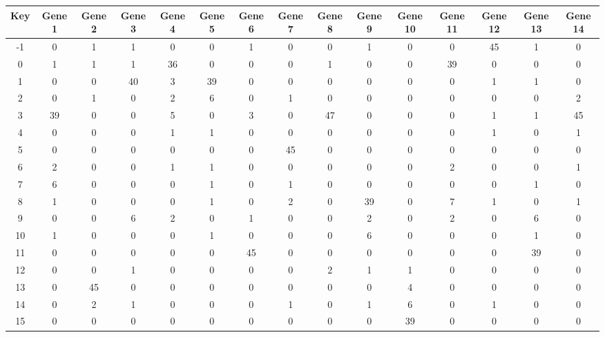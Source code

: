 \begin{tabular}{|c|c|c|c|c|c|c|c|c|c|c|c|c|c|c|}
\hline
Key & Gene 1 & Gene 2 & Gene 3 & Gene 4 & Gene 5 & Gene 6 & Gene 7 & Gene 8 & Gene 9 & Gene 10 & Gene 11 & Gene 12 & Gene 13 & Gene 14 \\
\hline
-1 & 0 & 1 & 1 & 0 & 0 & 1 & 0 & 0 & 1 & 0 & 0 & 45 & 1 & 0 \\
0 & 1 & 1 & 1 & 36 & 0 & 0 & 0 & 1 & 0 & 0 & 39 & 0 & 0 & 0 \\
1 & 0 & 0 & 40 & 3 & 39 & 0 & 0 & 0 & 0 & 0 & 0 & 1 & 1 & 0 \\
2 & 0 & 1 & 0 & 2 & 6 & 0 & 1 & 0 & 0 & 0 & 0 & 0 & 0 & 2 \\
3 & 39 & 0 & 0 & 5 & 0 & 3 & 0 & 47 & 0 & 0 & 0 & 1 & 1 & 45 \\
4 & 0 & 0 & 0 & 1 & 1 & 0 & 0 & 0 & 0 & 0 & 0 & 1 & 0 & 1 \\
5 & 0 & 0 & 0 & 0 & 0 & 0 & 45 & 0 & 0 & 0 & 0 & 0 & 0 & 0 \\
6 & 2 & 0 & 0 & 1 & 1 & 0 & 0 & 0 & 0 & 0 & 2 & 0 & 0 & 1 \\
7 & 6 & 0 & 0 & 0 & 1 & 0 & 1 & 0 & 0 & 0 & 0 & 0 & 1 & 0 \\
8 & 1 & 0 & 0 & 0 & 1 & 0 & 2 & 0 & 39 & 0 & 7 & 1 & 0 & 1 \\
9 & 0 & 0 & 6 & 2 & 0 & 1 & 0 & 0 & 2 & 0 & 2 & 0 & 6 & 0 \\
10 & 1 & 0 & 0 & 0 & 1 & 0 & 0 & 0 & 6 & 0 & 0 & 0 & 1 & 0 \\
11 & 0 & 0 & 0 & 0 & 0 & 45 & 0 & 0 & 0 & 0 & 0 & 0 & 39 & 0 \\
12 & 0 & 0 & 1 & 0 & 0 & 0 & 0 & 2 & 1 & 1 & 0 & 0 & 0 & 0 \\
13 & 0 & 45 & 0 & 0 & 0 & 0 & 0 & 0 & 0 & 4 & 0 & 0 & 0 & 0 \\
14 & 0 & 2 & 1 & 0 & 0 & 0 & 1 & 0 & 1 & 6 & 0 & 1 & 0 & 0 \\
15 & 0 & 0 & 0 & 0 & 0 & 0 & 0 & 0 & 0 & 39 & 0 & 0 & 0 & 0 \\
\hline
\end{tabular}